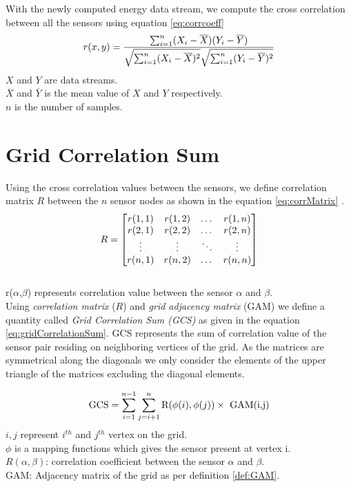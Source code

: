 With the newly computed energy data stream, we compute the cross correlation between all the sensors using equation \ref{eq:corrcoeff}
\begin{equation}
\label{eq:corrcoeff}
r(x,y)=\frac{\sum_{i=1}^{n}(X_i-\overline{X})(Y_i-\overline{Y})}{\sqrt{\sum_{i=1}^{n}(X_i-\overline{X})^2}\sqrt{\sum_{i=1}^{n}(Y_i-\overline{Y})^2}} \\
\end{equation}
$X$ and $Y$ are data streams.\\
$\overline{X}$ and $\overline{Y}$ is the mean value of $X$ and $Y$ respectively.\\
$n$ is the number of samples.\\

\section{Grid Correlation Sum}
\label{sec:gcs}
Using the cross correlation values between the sensors, we define correlation matrix $R$ between the $n$ sensor nodes as shown in the equation \ref{eq:corrMatrix} .
\begin{equation}
\label{eq:corrMatrix}
\centering
R = 
\begin{bmatrix}
    r(1,1) & r(1,2) & \dots  & r(1,n) \\
    r(2,1) & r(2,2)  & \dots  & r(2,n) \\
    \vdots & \vdots  & \ddots & \vdots \\
    r(n,1) & r(n,2)  & \dots  & r(n,n)
\end{bmatrix}
\end{equation}\\
r($\alpha$,$\beta$) represents correlation value between the sensor $\alpha$ and $\beta$.\\

Using \textit{correlation matrix} ($R$) and \textit{grid adjacency matrix} (GAM) we define a quantity called \textit{Grid Correlation Sum (GCS)} as given in the equation \ref{eq:gridCorrelationSum}. GCS represents the sum of correlation value of the sensor pair residing on neighboring vertices of the grid.
As the matrices are symmetrical along the diagonals we only consider the elements of the upper triangle of the matrices excluding the diagonal elements. 

\begin{equation}
\centering
\text{GCS}=\sum_{i=1}^{n-1}\sum_{j=i+1}^{n}\text{R}(\phi(i),\phi(j))  \times \text{ GAM(i,j)}
\label{eq:gridCorrelationSum}
\end{equation}
$i,j$ represent $ i^{th}$ and $ j^{th}$ vertex on the grid.\\
$\phi$ is a mapping functions which gives the sensor present at vertex i.\\
$R(\alpha,\beta)$: correlation coefficient between the sensor $\alpha$ and $\beta$.\\
GAM:  Adjacency matrix of the grid as per definition \ref{def:GAM}.\\

